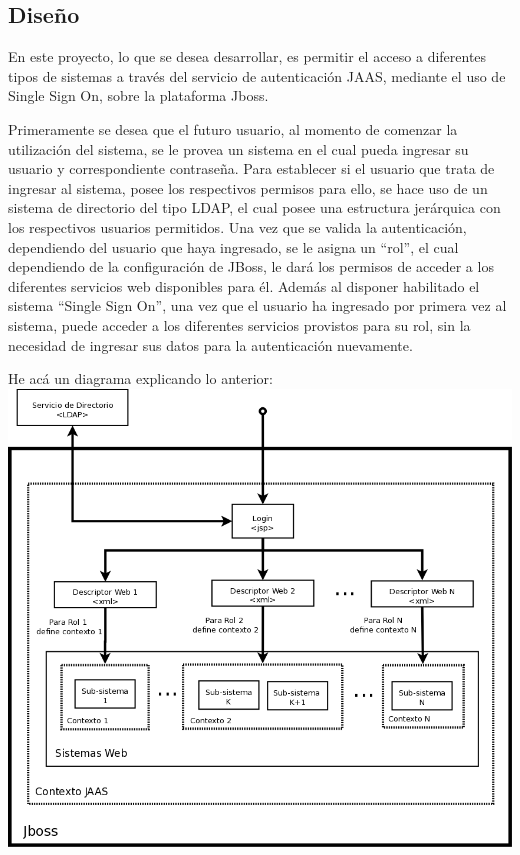
\subsection{Diseño}

En este proyecto, lo que se desea desarrollar, es permitir el acceso a diferentes tipos de sistemas a través del servicio de autenticación JAAS, mediante el uso de Single Sign On, sobre la plataforma Jboss.

Primeramente se desea que el futuro usuario, al momento de comenzar la utilización del sistema, se le provea un sistema en el cual pueda ingresar su usuario y correspondiente contraseña. Para establecer si el usuario que trata de ingresar al sistema, posee los respectivos permisos para ello, se hace uso de un sistema de directorio del tipo LDAP, el cual posee una estructura jerárquica con los respectivos usuarios permitidos. Una vez que se valida la autenticación, dependiendo del usuario que haya ingresado, se le asigna un ``rol'', el cual dependiendo de la configuración de JBoss, le dará los permisos de acceder a los diferentes servicios web disponibles para él. Además al disponer habilitado el sistema ``Single Sign On'', una vez que el usuario ha ingresado por primera vez al sistema, puede acceder a los diferentes servicios provistos para su rol, sin la necesidad de ingresar sus datos para la autenticación nuevamente.

He acá un diagrama explicando lo anterior:\\

\includegraphics[scale=0.35]{img/diseno}

